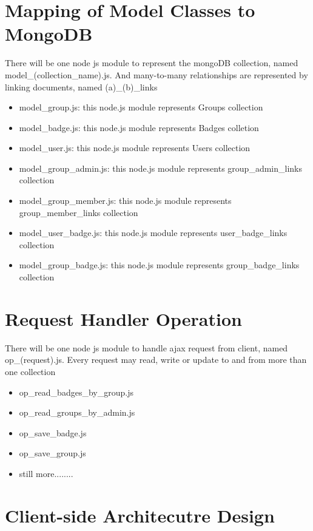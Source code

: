 \begin{itemize}
\section{Mapping of Model Classes to MongoDB}
There will be one node js module to represent the mongoDB collection, named model{\_}(collection{\_}name).js. And many-to-many relationships are represented by linking documents, named (a){\_}(b){\_}links

\begin{itemize}
\item model{\_}group.js: this node.js module represents Groups collection
\item model{\_}badge.js: this node.js module represents Badges colletion
\item model{\_}user.js: this node.js module represents Users collection
\item model{\_}group{\_}admin.js: this node.js module represents group{\_}admin{\_}links collection
\item model{\_}group{\_}member.js: this node.js module represents group{\_}member{\_}links collection
\item model{\_}user{\_}badge.js: this node.js module represents user{\_}badge{\_}links collection
\item model{\_}group{\_}badge.js: this node.js module represents group{\_}badge{\_}links collection
\end{itemize}

\section{Request Handler Operation}
There will be one node js module to handle ajax request from client, named op{\_}(request).js. Every request may read, write or update to and from more than one collection

\begin{itemize}
\item op{\_}read{\_}badges{\_}by{\_}group.js
\item op{\_}read{\_}groups{\_}by{\_}admin.js
\item op{\_}save{\_}badge.js
\item op{\_}save{\_}group.js
\item still more........
\end{itemize}

\section{Client-side Architecutre Design}



\end{itemize}
